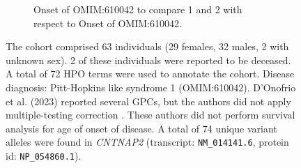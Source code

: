 \begin{figure}[htbp]
\vspace{2em}

\begin{subfigure}[b]{0.95\textwidth}
\captionsetup{justification=raggedright,singlelinecheck=false}
\caption{Onset of OMIM:610042 to compare 1 and 2 with respect to Onset of OMIM:610042.}
\end{subfigure}

\vspace{2em}

\caption{The cohort comprised 63 individuals (29 females, 32 males, 2 with unknown sex). 
2 of these individuals were reported to be deceased. A total of 72 HPO terms were used to 
annotate the cohort. Disease diagnosis: Pitt-Hopkins like syndrome 1 (OMIM:610042). 
D'Onofrio et al. (2023) reported several GPCs, but the authors did not
apply multiple-testing correction \cite{PMID_37183190}. These authors did not perform survival analysis for age of onset of disease.
A total of 74 unique variant alleles were found in \textit{CNTNAP2} (transcript: \texttt{NM\_014141.6}, protein id: \texttt{NP\_054860.1}).}
\end{figure}
